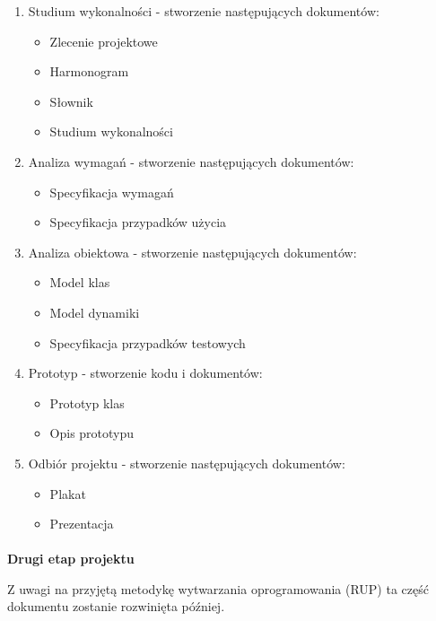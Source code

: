 \documentclass[a4paper,10pt]{article}
\begin{document}
\begin{enumerate}
 \item Studium wykonalności - stworzenie następujących dokumentów:
	\begin{itemize}
 		\item  Zlecenie projektowe
		\item  Harmonogram
		\item Słownik
		\item Studium wykonalności
	\end{itemize}

\item Analiza wymagań - stworzenie następujących dokumentów:
	\begin{itemize}
 		\item Specyfikacja wymagań
		\item Specyfikacja przypadków użycia
	\end{itemize}


\item Analiza obiektowa - stworzenie następujących dokumentów:
	\begin{itemize}
 		\item Model klas
		\item Model dynamiki
		\item Specyfikacja przypadków testowych
	\end{itemize}

\item Prototyp - stworzenie kodu i dokumentów:
	\begin{itemize}
 		\item Prototyp klas
		\item Opis prototypu
	\end{itemize}

\item Odbiór projektu - stworzenie następujących dokumentów:
	\begin{itemize}
 		\item Plakat
		\item Prezentacja
	\end{itemize}

\end{enumerate}

\paragraph{} \textbf{Drugi etap projektu}

Z uwagi na przyjętą metodykę wytwarzania oprogramowania (RUP) ta część dokumentu zostanie rozwinięta później.

%
\end{document}
